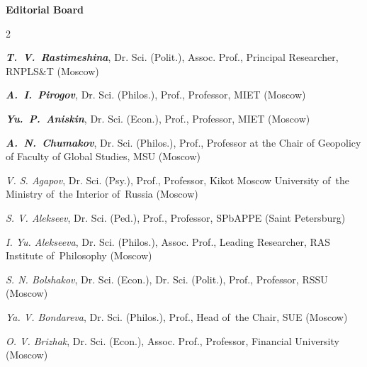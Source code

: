 


\begin{otherlanguage}{english}

\vspace*{-4em}

    \begin{center}
        \textbf{Editorial Board}
    \end{center}
    
    
    
    \begin{multicols}{2}
       \begin{flushleft}
            
        \scriptsize
    

    
\noindent\textit{\textbf{T. V. Rastimeshina}}, Dr. Sci. (Polit.), Assoc. Prof., Principal Researcher, RNPLS\&T (Moscow)
    
        
    
\noindent  \textit{\textbf{A. I. Pirogov}}, Dr. Sci. (Philos.), Prof., Professor, MIET (Moscow)



\noindent \textit{\textbf{Yu. P. Aniskin}}, Dr. Sci. (Econ.), Prof., Professor, MIET (Moscow)



\noindent \textit{\textbf{A. N. Chumakov}}, Dr. Sci. (Philos.), Prof., Professor at the Chair of Geopolicy of Faculty of Global Studies, MSU (Moscow)



\noindent \textit{V. S. Agapov}, Dr. Sci. (Psy.), Prof., Professor, Kikot Moscow University of the Ministry of the Interior of Russia (Moscow)

\noindent \textit{S. V. Alekseev}, Dr. Sci. (Ped.), Prof., Professor, SPbAPPE (Saint Petersburg)

\noindent \textit{I. Yu. Alekseeva}, Dr. Sci. (Philos.), Assoc. Prof., Leading Researcher, RAS Institute of Philosophy (Moscow)

\noindent \textit{S. N. Bolshakov}, Dr. Sci. (Econ.), Dr. Sci. (Polit.), Prof., Professor, RSSU (Moscow)

\noindent \textit{Ya. V. Bondareva}, Dr. Sci. (Philos.), Prof., Head of the Chair, SUE (Moscow)

\noindent \textit{O. V. Brizhak}, Dr. Sci. (Econ.), Assoc. Prof., Professor, Financial University (Moscow)


\end{flushleft}
\end{multicols}
\end{otherlanguage}
